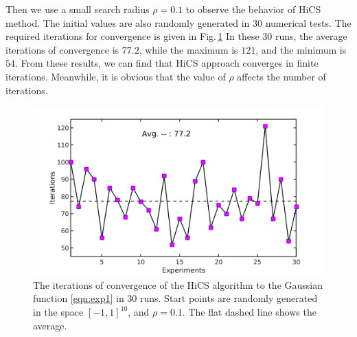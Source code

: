 \documentclass[final,1p,times]{elsarticle}
\begin{document}
Then we use a small search radius $\rho=0.1$ to observe the
behavior of HiCS method. The initial values are also randomly
generated in $30$ numerical tests. The required iterations for
convergence is given in Fig.\,\ref{fig:exp1:randInitr0_1}
In these $30$ runs, the average iterations of convergence is
$77.2$, while the maximum is $121$, and the minimum is $54$.
From these results, we can find that HiCS approach converges in
finite iterations. Meanwhile, it is obvious that the value of
$\rho$ affects the number of iterations. 
\begin{figure}[!htbp]
	\centering
	  \includegraphics[scale=0.2]{../figures/gauss10Drandr0_1.png}
	  \caption{The iterations of convergence of the 
	  HiCS algorithm to the Gaussian function
	  \eqref{eqn:exp1} in $30$ runs. Start points are randomly
	  generated in the space $[-1, 1]^{10}$, and $\rho=0.1$. 
	  The flat dashed line shows the average.} 
	  \label{fig:exp1:randInitr0_1}
\end{figure}


\end{document}
